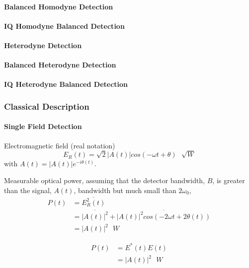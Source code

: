 \paragraph{Balanced Homodyne Detection}

\paragraph{IQ Homodyne Balanced Detection}

\paragraph{Heterodyne Detection}

\paragraph{Balanced Heterodyne Detection}

\paragraph{IQ Heterodyne Balanced Detection}


\subsubsection{Classical Description}

\paragraph{Single Field Detection}

Electromagnetic field (real notation)
\begin{equation}
    E_R(t)=\sqrt{2} |A(t)| cos\left(-\omega t + \theta\right) \,\,\,\, \sqrt{W}
\end{equation}
with $A(t)=|A(t)|e^{-i\theta(t)}$.

Measurable optical power, assuming that the detector bandwidth, $B$, is greater than the signal, $A(t)$, bandwidth but much small than $2 \omega_0$,
\begin{align}
	P(t) &= \overline{E_R^2(t)}\nonumber\\
         &= \overline{|A(t)|^2} + \overline{ |A(t)|^2 cos\left(-2 \omega t + 2\theta(t)\right)}\nonumber\\
         &= |A(t)|^2 \,\,\,\, W
\end{align}


\begin{align}
	P(t) &= E^{*}(t) E(t)\nonumber\\
         &= |A(t)|^2 \,\,\,\, W
\end{align}


